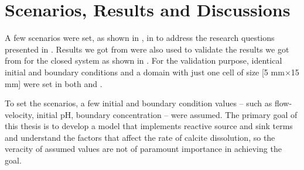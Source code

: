\chapter{Scenarios, Results and Discussions} \label{chapter:results}
\thispagestyle{empty}

A few scenarios were set, as shown in , in \DuMuX to address the 
research questions presented in . Results we got 
from \MATLAB were also used to validate the results we got from \DuMuX for the closed system 
as shown in . For the validation purpose, identical initial 
and boundary conditions and a domain with just one cell of size [5 mm$\times$15 mm] were 
set in both \MATLAB and \DuMuX. \\

\begin{table}[h!]
    \centering
    \caption [Scenarios in \DuMuX] {\textbf{Scenarios in \DuMuX}}
    \label{tab:scenarios}
\end{table}

To set the scenarios, a few initial and boundary condition values -- such as flow-velocity, initial pH, boundary  concentration -- were assumed. 
The primary goal of this thesis is to develop a model that implements reactive source and sink terms and understand 
the factors that affect the rate of calcite dissolution, so the veracity of assumed values are not of paramount importance in achieving the goal.\\

